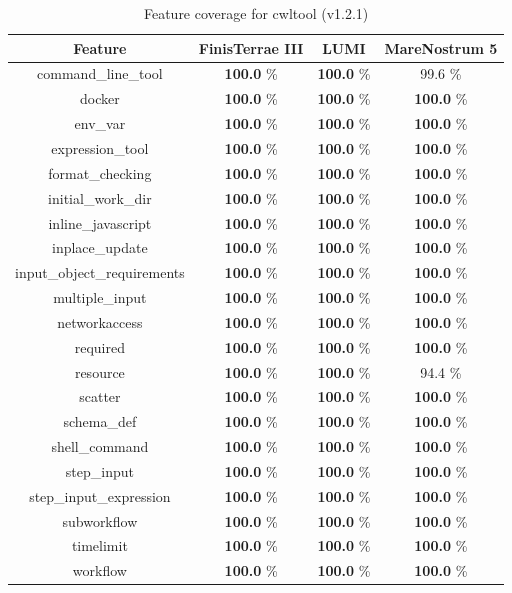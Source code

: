 \documentclass{article}
\begin{document}
\begin{table}[ht!]
\centering
\setlength{\tabcolsep}{6pt}
\renewcommand{\arraystretch}{1.2}
\begin{tabular}{|c|c|c|c|}
\hline
\rowcolor{lightgray!50}
\textbf{Feature} & \textbf{FinisTerrae III} & \textbf{LUMI} & \textbf{MareNostrum 5} \\
\hline
command\_line\_tool & \textbf{100.0} \% & \textbf{100.0} \% & 99.6 \% \\
docker & \textbf{100.0} \% & \textbf{100.0} \% & \textbf{100.0} \% \\
env\_var & \textbf{100.0} \% & \textbf{100.0} \% & \textbf{100.0} \% \\
expression\_tool & \textbf{100.0} \% & \textbf{100.0} \% & \textbf{100.0} \% \\
format\_checking & \textbf{100.0} \% & \textbf{100.0} \% & \textbf{100.0} \% \\
initial\_work\_dir & \textbf{100.0} \% & \textbf{100.0} \% & \textbf{100.0} \% \\
inline\_javascript & \textbf{100.0} \% & \textbf{100.0} \% & \textbf{100.0} \% \\
inplace\_update & \textbf{100.0} \% & \textbf{100.0} \% & \textbf{100.0} \% \\
input\_object\_requirements & \textbf{100.0} \% & \textbf{100.0} \% & \textbf{100.0} \% \\
multiple\_input & \textbf{100.0} \% & \textbf{100.0} \% & \textbf{100.0} \% \\
networkaccess & \textbf{100.0} \% & \textbf{100.0} \% & \textbf{100.0} \% \\
required & \textbf{100.0} \% & \textbf{100.0} \% & \textbf{100.0} \% \\
resource & \textbf{100.0} \% & \textbf{100.0} \% & 94.4 \% \\
scatter & \textbf{100.0} \% & \textbf{100.0} \% & \textbf{100.0} \% \\
schema\_def & \textbf{100.0} \% & \textbf{100.0} \% & \textbf{100.0} \% \\
shell\_command & \textbf{100.0} \% & \textbf{100.0} \% & \textbf{100.0} \% \\
step\_input & \textbf{100.0} \% & \textbf{100.0} \% & \textbf{100.0} \% \\
step\_input\_expression & \textbf{100.0} \% & \textbf{100.0} \% & \textbf{100.0} \% \\
subworkflow & \textbf{100.0} \% & \textbf{100.0} \% & \textbf{100.0} \% \\
timelimit & \textbf{100.0} \% & \textbf{100.0} \% & \textbf{100.0} \% \\
workflow & \textbf{100.0} \% & \textbf{100.0} \% & \textbf{100.0} \% \\
\hline
\end{tabular}
\caption{Feature coverage for cwltool (v1.2.1)}
\label{tab:cwltool_feat_v12}
\end{table}
\clearpage
\end{document}
